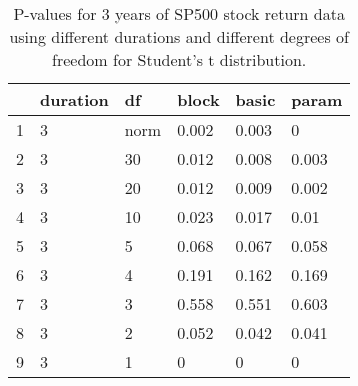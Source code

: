 \begin{table}[ht]
\centering
\caption{P-values for 3 years of SP500 stock return 
                   data using different durations
  and different degrees of freedom for Student's t distribution.} 
\label{table:SP5003}
\begin{tabular}{rlllll}
  \hline
 & duration & df & block & basic & param \\ 
  \hline
1 & 3 & norm & 0.002 & 0.003 & 0 \\ 
  2 & 3 & 30 & 0.012 & 0.008 & 0.003 \\ 
  3 & 3 & 20 & 0.012 & 0.009 & 0.002 \\ 
  4 & 3 & 10 & 0.023 & 0.017 & 0.01 \\ 
  5 & 3 & 5 & 0.068 & 0.067 & 0.058 \\ 
  6 & 3 & 4 & 0.191 & 0.162 & 0.169 \\ 
  7 & 3 & 3 & 0.558 & 0.551 & 0.603 \\ 
  8 & 3 & 2 & 0.052 & 0.042 & 0.041 \\ 
  9 & 3 & 1 & 0 & 0 & 0 \\ 
   \hline
\end{tabular}
\end{table}

